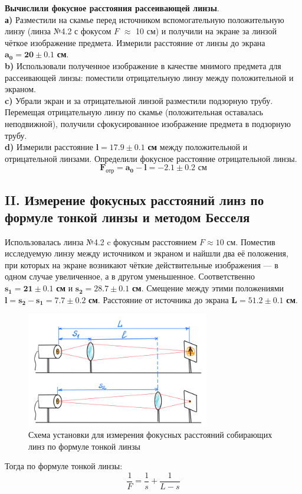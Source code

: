 \indent \textbf{Вычислили фокусное расстояния рассеивающей линзы}.\\
\textbf{а)} Разместили на скамье перед источником вспомогательную положительную линзу (линза №4.2 с фокусом $F$ $\approx$ 10 см) и получили на экране за линзой чёткое изображение предмета. Измерили расстояние от линзы до экрана $\bm{a_0 = 20\pm0.1 }$ \textbf{см}. \\
\textbf{b)} Использовали полученное изображение в качестве мнимого предмета для рассеивающей линзы: поместили отрицательную линзу между положительной и экраном. \\
\textbf{c)} Убрали экран и за отрицательной линзой разместили подзорную трубу. Перемещая отрицательную линзу по скамье (положительная оставалась неподвижной), получили сфокусированное изображение предмета в подзорную трубу. \\
\textbf{d)} Измерили расстояние $\bm{l = 17.9 \pm 0.1 }$\textbf{ см} между положительной и отрицательной линзами. Определили фокусное расстояние отрицательной линзы. \\
\begin{equation}
    \bm{F_{\text{отр}} = a_0 - l = -2.1 \pm 0.2} \textbf{ см}
\end{equation}

\subsection*{II. Измерение фокусных расстояний линз по формуле тонкой линзы и
методом Бесселя}
Использовалась линза №4.2 c фокусным расстоянием $F \approx 10$ {см}.
Поместив исследуемую линзу между источником и экраном и найшли два её
положения, при которых на экране возникают чёткие действительные изображения
— в одном случае увеличенное, а в другом уменьшенное. Соответственно $\bm{s_1 = 21\pm0.1}$ \textbf{см} и $\bm{s_2 = 28.7 \pm 0.1}$ \textbf{см}. Смещение между этими положениями $\bm{l = s_2 - s_1 = 7.7 \pm 0.2}$ \textbf{см}. Расстояние от источника до экрана $\bm{L = 51.2 \pm 0.1}$ \textbf{см}.
\begin{figure}[h!]
    \centering
    \includegraphics[width=8cm]{images/setup2.png}
    \caption{Схема установки для измерения фокусных расстояний собирающих линз по формуле тонкой линзы}
\end{figure}
Тогда по формуле тонкой линзы:
\begin{equation}
    \frac{1}{F} = \frac{1}{s} + \frac{1}{L - s}
\end{equation}

